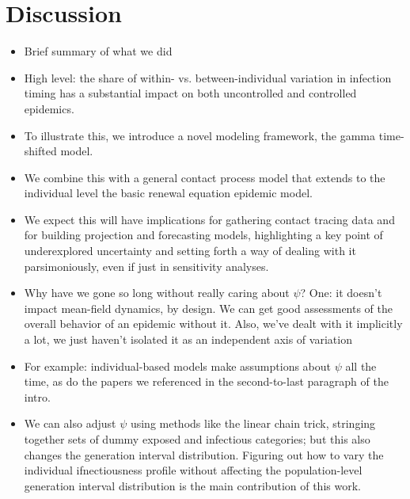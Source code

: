 





















  \clearpage
\section{Discussion}

\begin{itemize}
  \item Brief summary of what we did 
  \item High level: the share of within- vs. between-individual variation in infection timing has a substantial impact on both uncontrolled and controlled epidemics. 
  \item To illustrate this, we introduce a novel modeling framework, the gamma time-shifted model. 
  \item We combine this with a general contact process model that extends to the individual level the basic renewal equation epidemic model. 
  \item We expect this will have implications for gathering contact tracing data and for building projection and forecasting models, highlighting a key point of underexplored uncertainty and setting forth a way of dealing with it parsimoniously, even if just in sensitivity analyses. 
\end{itemize}

\begin{itemize}
  \item Why have we gone so long without really caring about $\psi$? One: it doesn't impact mean-field dynamics, by design. We can get good assessments of the overall behavior of an epidemic without it. Also, we've dealt with it implicitly a lot, we just haven't isolated it as an independent axis of variation
  \item For example: individual-based models make assumptions about $\psi$ all the time, as  do the papers we referenced in the second-to-last paragraph of the intro. 
  \item We can also adjust $\psi$ using methods like the linear chain trick, stringing together sets of dummy exposed and infectious categories; but this also changes the generation interval distribution. Figuring out how to vary the individual ifnectiousness profile without affecting the population-level generation interval distribution is the main contribution of this work. 
\end{itemize}

